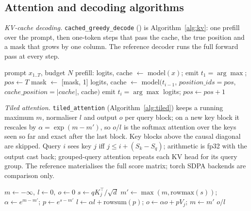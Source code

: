 \documentclass[conference]{IEEEtran}
\newcommand{\code}[1]{\texttt{#1}}
\begin{document}
\subsection{Attention and decoding algorithms}
\emph{KV-cache decoding.} \code{cached\_greedy\_decode} () is Algorithm~\ref{alg:kv}: one prefill over the prompt, then one-token steps that pass the cache, the true position and a mask that grows by one column. The reference decoder runs the full forward pass at every step.

\begin{algorithm}[t]
\caption{KV-cache greedy decoding}\label{alg:kv}
\small
\begin{algorithmic}[1]
\REQUIRE prompt $x_{1..T}$, budget $N$
\STATE prefill: logits, cache $\leftarrow$ model$(x)$; emit $t_1=\arg\max$; $pos\leftarrow T$
\STATE mask $\leftarrow$ [mask, 1] 
\STATE logits, cache $\leftarrow$ model$(t_{i-1}$, $position\_ids{=}pos$, $cache\_position{=}|cache|$, cache$)$
\STATE emit $t_i=\arg\max$ logits; $pos\leftarrow pos+1$
\ENDFOR
\end{algorithmic}
\end{algorithm}

\emph{Tiled attention.} \code{tiled\_attention} (Algorithm~\ref{alg:tiled}) keeps a running maximum $m$, normaliser $l$ and output $o$ per query block; on a new key block it rescales by $\alpha=\exp(m-m')$, so $o/l$ is the softmax attention over the keys seen so far and exact after the last block. Key blocks above the causal diagonal are skipped. Query $i$ sees key $j$ iff $j\le i+(S_k-S_q)$; arithmetic is fp32 with the output cast back; grouped-query attention repeats each KV head for its query group. The reference materialises the full score matrix; torch SDPA backends are comparison only. %

\begin{algorithm}[t]
\caption{Tiled online-softmax attention (one query block $q$)}\label{alg:tiled}
\small
\begin{algorithmic}[1]
\STATE $m\leftarrow-\infty,\ l\leftarrow 0,\ o\leftarrow 0$
\STATE $s\leftarrow qK_j^{\top}/\sqrt d$ 
\STATE $m'\leftarrow\max(m,\mathrm{rowmax}(s))$; $\alpha\leftarrow e^{m-m'}$; $p\leftarrow e^{s-m'}$
\STATE $l\leftarrow\alpha l+\mathrm{rowsum}(p)$; $o\leftarrow\alpha o+pV_j$; $m\leftarrow m'$
\ENDFOR
\RETURN $o/l$
\end{algorithmic}
\end{algorithm}
\end{document}
